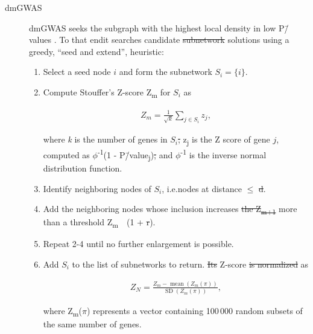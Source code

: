\documentclass[10pt,letterpaper]{article}
\providecommand{\DIFaddtex}[1]{{\protect\color{blue}\uwave{#1}}} %
\providecommand{\DIFdeltex}[1]{{\protect\color{red}\sout{#1}}}                      %
\providecommand{\DIFaddbegin}{} %
\providecommand{\DIFaddend}{} %
\providecommand{\DIFdelbegin}{} %
\providecommand{\DIFdelend}{} %
\providecommand{\DIFadd}[1]{\texorpdfstring{\DIFaddtex{#1}}{#1}} %
\providecommand{\DIFdel}[1]{\texorpdfstring{\DIFdeltex{#1}}{}} %
\newcommand{\DIFscaledelfig}{0.5}
\newlength{\DIFdelgraphicswidth} %
\newlength{\DIFdelgraphicsheight} %
\newcommand{\DIFaddincludegraphics}[2][]{{\color{blue}\fbox{\DIFOincludegraphics[#1]{#2}}}} %
\newcommand{\DIFdelincludegraphics}[2][]{%
\sbox{\DIFdelgraphicsbox}{\DIFOincludegraphics[#1]{#2}}%
\settoboxwidth{\DIFdelgraphicswidth}{\DIFdelgraphicsbox} %
\settoboxtotalheight{\DIFdelgraphicsheight}{\DIFdelgraphicsbox} %
\scalebox{\DIFscaledelfig}{%
\parbox[b]{\DIFdelgraphicswidth}{\usebox{\DIFdelgraphicsbox}\\[-\baselineskip] \rule{\DIFdelgraphicswidth}{0em}}\llap{\resizebox{\DIFdelgraphicswidth}{\DIFdelgraphicsheight}{%
\setlength{\unitlength}{\DIFdelgraphicswidth}%
\begin{picture}(1,1)%
\thicklines\linethickness{2pt} %
{\color[rgb]{1,0,0}\put(0,0){\framebox(1,1){}}}%
{\color[rgb]{1,0,0}\put(0,0){\line( 1,1){1}}}%
{\color[rgb]{1,0,0}\put(0,1){\line(1,-1){1}}}%
\end{picture}%
}\hspace*{3pt}}} %
} %
\DeclareRobustCommand{\DIFaddbegin}{\DIFOaddbegin \let\includegraphics\DIFaddincludegraphics} %
\DeclareRobustCommand{\DIFaddend}{\DIFOaddend \let\includegraphics\DIFOincludegraphics} %
\DeclareRobustCommand{\DIFdelbegin}{\DIFOdelbegin \let\includegraphics\DIFdelincludegraphics} %
\DeclareRobustCommand{\DIFdelend}{\DIFOaddend \let\includegraphics\DIFOincludegraphics} %
\begin{document}
\begin{description}
\item[{dmGWAS}] dmGWAS seeks the subgraph with the highest local density in low P\=/values \cite{jia_dmgwas:_2011}. To that end\DIFaddbegin \DIFadd{, }\DIFaddend it searches candidate \DIFdelbegin \DIFdel{subnetwork }\DIFdelend solutions using a greedy, ``seed and extend'', heuristic:

\begin{enumerate}
\item Select a seed node $i$ and form the subnetwork $S_i=\{i\}$.
\item Compute Stouffer's Z-score Z\textsubscript{m} for $S_i$ as

\begin{eqnarray} 
Z_m = \frac{1}{\sqrt{k}} \sum_{j \in S_i} z_j,
\end{eqnarray}

where \emph{k} is the number of genes in $S_i$\DIFdelbegin \DIFdel{; }\DIFdelend \DIFaddbegin \DIFadd{, }\DIFaddend z\textsubscript{j} is the Z score of gene $j$, computed as \(\phi\)\textsuperscript{-1}(1 - P\=/value\textsubscript{j})\DIFdelbegin \DIFdel{; }\DIFdelend \DIFaddbegin \DIFadd{, }\DIFaddend and \(\phi\)\textsuperscript{-1} is the inverse normal distribution function.
\item Identify neighboring nodes of $S_i$, i.e.\DIFaddbegin \DIFadd{, }\DIFaddend nodes at distance \(\le\) \DIFdelbegin \DIFdel{d}\DIFdelend \DIFaddbegin \texttt{\DIFadd{d}}\DIFaddend .
\item Add the neighboring nodes whose inclusion increases \DIFdelbegin \DIFdel{the Z\textsubscript{m+1} }\DIFdelend \DIFaddbegin \DIFadd{Z\textsubscript{m+1} by }\DIFaddend more than a threshold Z\textsubscript{m}~\texttimes{}~(1 + \DIFdelbegin \DIFdel{r}\DIFdelend \DIFaddbegin \texttt{\DIFadd{r}}\DIFaddend ).
\item Repeat 2-4 until no further enlargement is possible.
\item Add $S_i$ to the list of subnetworks to return. \DIFdelbegin \DIFdel{Its }\DIFdelend \DIFaddbegin \DIFadd{Normalize its }\DIFaddend Z-score \DIFdelbegin \DIFdel{is normalized }\DIFdelend as

\begin{eqnarray}
Z_{N}=\frac{Z_{m}-\operatorname{mean}\left(Z_{m}(\pi)\right)}{\operatorname{SD}\left(Z_{m}(\pi)\right)},
\end{eqnarray} 

where Z\textsubscript{m}(\(\pi\)) represents a vector containing 100\,000 random subsets of the same number of genes.
\end{enumerate}


\end{description}
\end{document}
